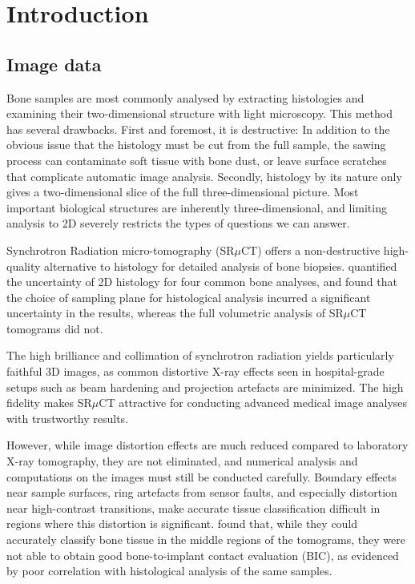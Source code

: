 \documentclass[pdflatex,sn-mathphys]{sn-jnl}%
\theoremstyle{thmstyleone}%
\theoremstyle{thmstyletwo}%
\theoremstyle{thmstylethree}%
\begin{document}
\newcommand{\xx}{\mathbf{x}}
\newcommand{\fval}{x}
\newcommand{\lab}{\mathrm{L}}
\newcommand{\micron}{\ensuremath{\mu\text{m}}}
\newcommand{\Pof}[2]{P\!\left(#1\middle\vert #2\right)}
\newcommand{\voxels}{\mathsf{voxels}}
\newcommand{\field}{\mathsf{field}}

\section{Introduction}
\label{sec:intro}


\subsection{Image data}

Bone samples are most commonly analysed by extracting histologies and examining their
two-dimensional structure with light microscopy. This method has several drawbacks. First and
foremost, it is destructive: In addition to the obvious issue that the histology must be cut
from the full sample, the sawing process can contaminate soft tissue with bone dust, or leave
surface scratches that complicate automatic image analysis. Secondly, histology by its nature
only gives a two-dimensional slice of the full three-dimensional picture. Most important
biological structures are inherently three-dimensional, and limiting analysis to 2D severely
restricts the types of questions we can answer.

Synchrotron Radiation micro-tomography (SR$\mu$CT) offers a non-destructive high-quality
alternative to histology for detailed analysis of bone biopsies. \cite{torsten2018}
quantified the uncertainty of 2D histology for four common bone analyses, and found that the
choice of sampling plane for histological analysis incurred a significant uncertainty in the
results, whereas the full volumetric analysis of SR$\mu$CT tomograms did not.

The high brilliance and collimation of synchrotron radiation yields particularly
faithful 3D images, as common distortive X-ray effects seen in hospital-grade setups such
as beam hardening and projection artefacts are minimized. The high fidelity makes SR$\mu$CT
attractive for conducting advanced medical image analyses with trustworthy results.

However, while image distortion effects are much reduced compared to laboratory X-ray tomography,
they are not eliminated, and numerical analysis and computations on the images must still be
conducted carefully. Boundary effects near sample surfaces, ring artefacts from sensor faults, and especially
distortion near high-contrast transitions, make accurate tissue classification difficult in
regions where this distortion is significant. \cite{sporring} found that, while
they could accurately classify bone tissue in the middle regions of the tomograms, they were
not able to obtain good bone-to-implant contact evaluation (BIC), as evidenced by poor correlation
with histological analysis of the same samples.
\end{document}
